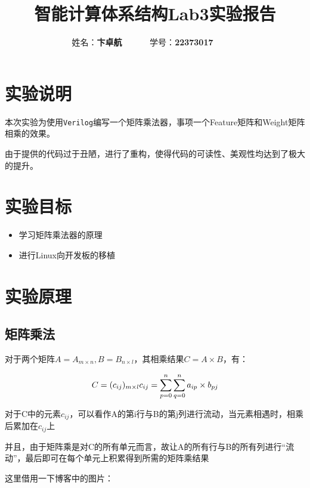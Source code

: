 \documentclass[12pt,a4paper]{article}
\begin{document}
\title{智能计算体系结构Lab3实验报告}
\date{}

\author{
姓名：\textbf{卞卓航}~~~~~~
学号：\textbf{22373017}~~~~~~
}

\maketitle

\section{实验说明}

本次实验为使用\texttt{Verilog}编写一个矩阵乘法器，事项一个Feature矩阵和Weight矩阵相乘的效果。

由于提供的代码过于丑陋，进行了重构，使得代码的可读性、美观性均达到了极大的提升。

\section{实验目标}

\begin{itemize}
\item
  学习矩阵乘法器的原理
\item
  进行Linux向开发板的移植
\end{itemize}

\section{实验原理}

\subsection{矩阵乘法}

对于两个矩阵$A = A_{m \times n}, B = B_{n \times l}$，其相乘结果$C = A \times B$，有：

$$
C = (c_{ij})_{m \times l} \\
c_{ij} = \sum_{p=0}^{n} \sum_{q = 0}^{n} a_{ip} \times b_{pj}
$$

对于C中的元素$c_{ij}$，可以看作A的第i行与B的第j列进行流动，当元素相遇时，相乘后累加在$c_{ij}$上

并且，由于矩阵乘是对C的所有单元而言，故让A的所有行与B的所有列进行``流动''，最后即可在每个单元上积累得到所需的矩阵乘结果

这里借用一下博客中的图片：
\end{document}

